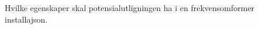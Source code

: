 



Hvilke egenskaper skal potensialutligningen ha i en frekvensomformer installajson.
\\[1cm]

















